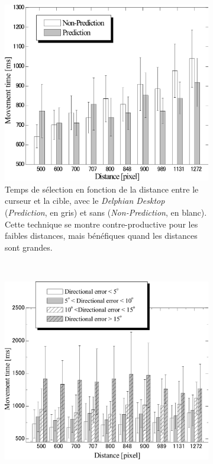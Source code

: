 \begin{appendices}
	\begin{figure}[htbp]
		\begin{subfigure}[t]{0.49\textwidth}
			\centering
			\includegraphics[width=\textwidth]{figures/ch2/delphianTimes}
			\caption{Temps de sélection en fonction de la distance entre le curseur et la cible, avec le \emph{Delphian Desktop} (\emph{Prediction}, en gris) et sans (\emph{Non-Prediction}, en blanc). Cette technique se montre contre-productive pour les faibles distances, mais bénéfiques quand les distances sont grandes.}
			\label{fig:delphianTimes}
		\end{subfigure}
		~
		\begin{subfigure}[t]{0.49\textwidth}
			\centering
			\includegraphics[width=\textwidth]{figures/ch2/delphianTimesErrors}

\end{subfigure}
\end{figure}
\end{appendices}
